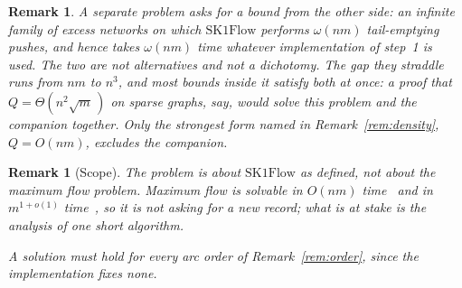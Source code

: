 \documentclass[10pt]{article}
\newtheorem{remark}[theorem]{Remark}
\newcommand{\SKF}{\text{SK1Flow}}
\begin{document}
\begin{remark}\label{rem:dichotomy}
A separate problem asks for a bound from the
other side: an infinite family of excess networks on which $\SKF$ performs
$\omega(nm)$ tail-emptying pushes, and hence takes $\omega(nm)$ time whatever
implementation of step~1 is used. The two are not alternatives and not a
dichotomy. The gap they straddle runs from $nm$ to $n^{3}$, and most bounds
inside it satisfy both at once: a proof that $Q=\Theta(n^{2}\sqrt m\,)$ on sparse
graphs, say, would solve this problem and the companion together. Only the
strongest form named in Remark~\ref{rem:density}, $Q=O(nm)$, excludes the
companion.
\end{remark}

\begin{remark}[Scope]\label{rem:scope}
The problem is about $\SKF$ as defined, not about the maximum flow problem.
Maximum flow is solvable in $O(nm)$ time~\cite{Orlin13} and in
$m^{1+o(1)}$ time~\cite{CKLPGS22}, so it is not asking for a new record; what is
at stake is the analysis of one short algorithm.

A solution must hold for every arc order of Remark~\ref{rem:order}, since the
implementation fixes none.
\end{remark}
\end{document}
